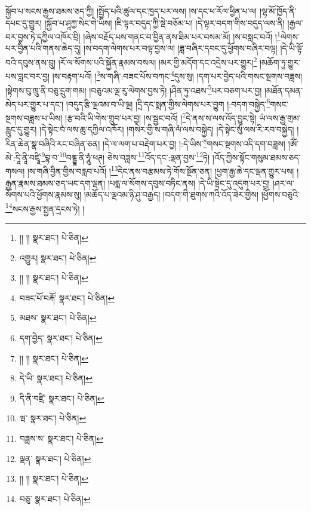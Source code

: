 སྐྱོབ་པ་སངས་རྒྱས་ཐམས་ཅད་ཀྱི། །སྤྱོད་པའི་ཚུལ་དང་ཁྱད་པར་ལས། །ས་དང་ཕ་རོལ་ཕྱིན་པ་ལ། །ལྷ་མོ་ཁྱོད་ནི་དཔང་དུ་གྱུར། །སྐྱོབ་པ་ཤཱཀྱ་སེང་གེ་ཡིས། །ཇི་ལྟར་བདུད་ཀྱི་སྡེ་བཅོམ་པ། །དེ་ལྟར་བདག་གིས་བདུད་ལས་ནི། །རྒྱལ་བར་བྱས་ཏེ་དཀྱིལ་འཁོར་བྲི། །ཞེས་བརྗོད་པས་གནང་བ་བྱིན་ནས་ཐིམ་པར་བསམ་མོ། །ས་བསླང་བའོ། །\footnote{།། །།  སྣར་ཐང་།  པེ་ཅིན། }ལེགས་པར་བྱིན་པའི་གནས་ཆེད་དུ། །ས་བདག་ལེགས་པར་བལྟ་བྱས་ལ། །ཟླ་བཞིར་དབང་དུ་ཕྱོགས་བཞིར་བལྟ། །དེ་ཡི་ལྟོ་བའི་དབུས་ནས་བྲུ། །རོ་ལ་སོགས་པའི་སྐྱོན་རྣམས་བསལ། །མར་གྱི་མདོག་དང་འདྲེས་པར་གྱུར།\footnote{འགྱུར།  སྣར་ཐང་།  པེ་ཅིན། } །མཆོག་ཏུ་གྱུར་པས་བླང་བར་བྱ། །ས་བརྟག་པའོ། །\footnote{།། །།  སྣར་ཐང་།  པེ་ཅིན། }ས་གཞི་:བཟང་པོས་བཀང་\footnote{བཟང་པོ་བརྐོ་  སྣར་ཐང་།  པེ་ཅིན། }དུས་སུ། །དག་པར་བྱེད་པའི་གསང་སྔགས་བཟླས། །སྟེགས་བུ་ཁྲུ་ནི་བཅུ་དྲུག་གམ། །བཅུའམ་ལྔ་རུ་ལེགས་བྱས་ཏེ། །ཤིན་ཏུ་འཐས་\footnote{མཐས་  སྣར་ཐང་།  པེ་ཅིན། }པར་བཅག་པར་བྱ། །མཐོན་དམན་མེད་པར་གྱུར་པ་དང་། །བདུད་རྩི་ལྔའམ་བ་ཡི་ལྔ། །དྲི་དང་སྨན་གྱིས་ལེགས་པར་བྱུག །:བདག་བསྐྱེད་\footnote{དག་བྱེད་  སྣར་ཐང་།  པེ་ཅིན། }གསང་སྔགས་བཟླས་པ་ཡིས། །རྩ་བའི་ཡི་གེས་གྲུབ་པར་བྱ། །ས་སྦྱང་བའོ། །\footnote{།། །།  སྣར་ཐང་།  པེ་ཅིན། }དེ་ནས་ས་ལས་འོད་བྱུང་སྟེ། ཡཾ་ལས་རྒྱ་གྲམ་རླུང་དུ་གྱུར། །དེ་སྟེང་བཾ་ལས་ཆུ་དཀྱིལ་འཁོར། །གསེར་གྱི་ས་གཞི་ལཾ་ལས་བསྐྱེད། །དེ་སྟེང་སུཾ་ལས་རི་རབ་བསྐྱེད། །རིན་ཆེན་སྣ་བཞིའི་རང་བཞིན་ཅན། །དེ་ལ་ལག་པ་བརྡེག་པར་བྱ། །:དེ་ཡིས་\footnote{དེ་ཡི་  སྣར་ཐང་།  པེ་ཅིན། }གསང་སྔགས་འདི་དག་བཟླས། །ཨོཾ་མེ་:དཱི་ནཱི་བཛྲཱི་\footnote{དི་ནི་བཛྲི་  སྣར་ཐང་།  པེ་ཅིན། }བྷ་བ་\footnote{ཝ་  སྣར་ཐང་།  པེ་ཅིན། }བནྡྷ་ནི་ཧཱུཾ་ཕཊ། ཅེས་བཟླས་\footnote{བཟླས་ས་  སྣར་ཐང་།  པེ་ཅིན། }འོད་དང་:ལྡན་བྱས་\footnote{ལྡན་  སྣར་ཐང་།  པེ་ཅིན། }ཏེ། །འོད་ཀྱིས་སྟོང་གསུམ་ཐམས་ཅད་གསལ། །ས་གཞི་བྱིན་གྱིས་བརླབ་པའོ། །\footnote{།། །།  སྣར་ཐང་།  པེ་ཅིན། }དེང་ནས་བརྩམས་ཏེ་གོས་སྔོན་ཅན། །ཕྱག་རྒྱ་ཆེ་དང་ལྡན་གྱུར་པས། །རྒྱན་རྣམས་ཐམས་ཅད་ཡང་དག་ལྡན། །པདྨ་ལ་སོགས་དབུས་བཏིང་ནས། །དེ་ཡི་སྟེང་དུ་འདུག་པར་བྱ། །ཤར་ལ་སོགས་པའི་ཕྱོགས་རྣམས་སུ། །མཆོད་པ་ལྔའམ་ཉི་ཤུ་བརྒྱད། །བདག་གི་ཐུགས་ཀའི་འོད་ཟེར་གྱིས། །ཕྱོགས་བཅུའི་\footnote{བཅུ་  སྣར་ཐང་།  པེ་ཅིན། }སངས་རྒྱས་སྤྱན་དྲངས་ཏེ། །
